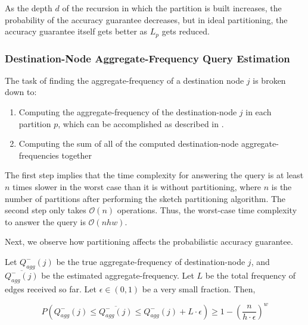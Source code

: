 \begin{remarks}
As the depth $d$ of the recursion in which the partition is built increases, the probability of the accuracy guarantee decreases, but in ideal partitioning, the accuracy guarantee itself gets better as $L_p$ gets reduced.
\end{remarks}

\subsubsection{Destination-Node Aggregate-Frequency Query Estimation}

The task of finding the aggregate-frequency of a destination node $j$ is broken down to:

\begin{enumerate}
\item Computing the aggregate-frequency of the destination-node $j$ in each partition $p$, which can be accomplished as described in \cite{khan}.
\item Computing the sum of all of the computed destination-node aggregate-frequencies together
\end{enumerate}

The first step implies that the time complexity for answering the query is at least $n$ times slower in the worst case than it is without partitioning, where $n$ is the number of partitions after performing the sketch partitioning algorithm. The second step only takes $\mathcal{O}(n)$ operations. Thus, the worst-case time complexity to answer the query is $\mathcal{O}(nhw)$.

Next, we observe how partitioning affects the probabilistic accuracy guarantee.
\begin{theorem}
\label{thm:agg2}
Let $Q_{agg}^{-}(j)$ be the true aggregate-frequency of destination-node $j$, and $\overline{Q_{agg}^{-}(j)}$ be the estimated aggregate-frequency. Let $L$ be the total frequency of edges received so far. Let $\epsilon \in (0,1)$ be a very small fraction. Then,
  
  \[
P(Q_{agg}^{-}(j) \leq \overline{Q_{agg}^{-}(j)} \leq Q_{agg}^{-}(j) + L \cdot \epsilon) \geq 1-(\frac{n}{h\cdot\epsilon})^w
\]

\end{theorem}


